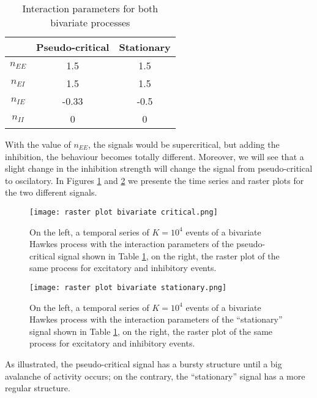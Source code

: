 \begin{table}[H]
    \centering
    \caption{Interaction parameters for both bivariate processes}
    \label{tab: Hawkes coupled parameters}
    \begin{tabular}{@{}ccc@{}}
    \toprule
     & \multicolumn{1}{c}{Pseudo-critical} & \multicolumn{1}{c}{Stationary} \\ \midrule
    $n_{EE}$ & 1.5 & 1.5 \\
    $n_{EI}$ & 1.5 & 1.5 \\
    $n_{IE}$ & -0.33 & -0.5 \\
    $n_{II}$ & 0 & 0 \\ \bottomrule
    \end{tabular}
\end{table}

With the value of $n_{EE}$, the signals would be supercritical, but adding the inhibition, the behaviour becomes totally different. Moreover, we will see that a 
slight change in the inhibition strength will change the signal from pseudo-critical to oscilatory. In Figures \ref{f: Hawkes coupled pseudo} and \ref{f: Hawkes coupled oscilatory}
we presente the time series and raster plots for the two different signals.

\begin{figure}[H]
    \centering
    \texttt{[image: raster plot bivariate critical.png]}
    \caption{On the left, a temporal series of $K=10^4$ events of a bivariate Hawkes process with the interaction parameters of the pseudo-critical signal shown in Table \ref{tab: Hawkes coupled parameters},
    on the right, the raster plot of the same process for excitatory and inhibitory events.}
    \label{f: Hawkes coupled pseudo}
\end{figure}

\begin{figure}[H]
    \centering
    \texttt{[image: raster plot bivariate stationary.png]}
    \caption{On the left, a temporal series of $K=10^4$ events of a bivariate Hawkes process with the interaction parameters of the ``stationary'' signal shown in Table \ref{tab: Hawkes coupled parameters},
    on the right, the raster plot of the same process for excitatory and inhibitory events.}
    \label{f: Hawkes coupled oscilatory}
\end{figure}

As illustrated, the pseudo-critical signal has a bursty structure until a big avalanche of activity occurs; on the contrary, the ``stationary'' signal has a more regular structure.

